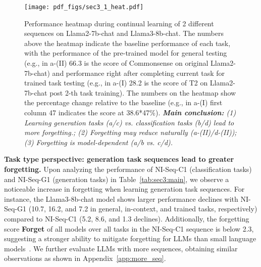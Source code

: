 \begin{figure*}[t!]
  \centering
  \texttt{[image: pdf\_figs/sec3\_1\_heat.pdf]}
  \vspace{-1.0em}
  \caption{Performance heatmap during continual learning of 2 different sequences on Llama2-7b-chat and Llama3-8b-chat. The numbers above the heatmap indicate the baseline performance of each task, with the performance of the pre-trained model for general testing (e.g., in a-(II) 66.3 is the score of Commonsense on original Llama2-7b-chat) and performance right after completing current task for trained task testing (e.g., in a-(I) 28.2 is the score of T2 on Llama2-7b-chat post 2-th task training). The numbers on the heatmap show the percentage change relative to the baseline (e.g., in a-(I) first column 47 indicates the score at 38.6*47\%).  \textit{\textbf{Main conclusion:} (1) Learning generation tasks (a/c) vs. classification tasks (b/d) lead to more forgetting.; (2) Forgetting may reduce naturally (a-(II)/d-(II)); (3) Forgetting is model-dependent (a/b vs. c/d).}}
  \label{fig:sec3:heat}
  \vspace{-0.6em}
\end{figure*}


\textbf{Task type perspective: generation task sequences lead to greater forgetting.} 
Upon analyzing the performance of NI-Seq-C1 (classification tasks) and NI-Seq-G1 (generation tasks) in Table~\ref{tab:sec3:main}, we observe a noticeable increase in forgetting when learning generation task sequences. For instance, the Llama3-8b-chat model shows larger performance declines with NI-Seq-G1 (10.7, 16.2, and 7.2 in general, in-context, and trained tasks, respectively) compared to NI-Seq-C1 (5.2, 8.6, and 1.3 declines). 
Additionally, the forgetting score \textbf{Forget}
of all models over all tasks in the NI-Seq-C1 sequence is below 2.3, suggesting a stronger ability to mitigate forgetting for LLMs than small language  models~\citep{qin2022lfpt,razdaibiedina2023progressive}. 
We further evaluate LLMs with more sequences, obtaining similar observations as shown in Appendix~\ref{app:more_seq}.


